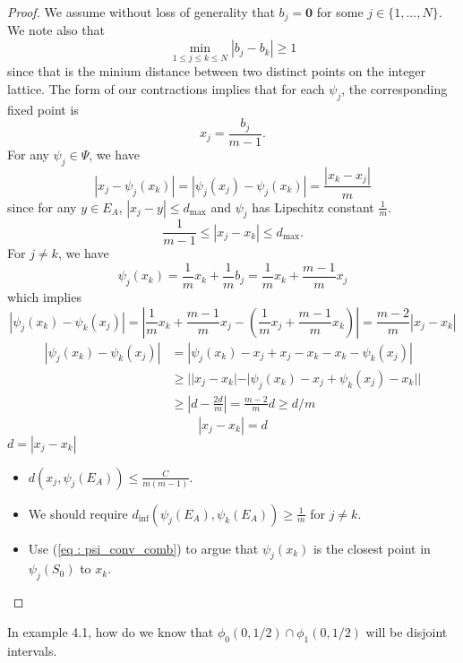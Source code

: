 \documentclass [52pt] {article}
\begin{document}
\begin{proof}
We assume without loss of generality that $b_j = \mathbf{0}$ for some $j\in\{1,...,N\}$.  We note also that 
\[\min_{1\le j\le k\le N}|b_j - b_k| \ge 1\]
since that is the minium distance between two distinct points on the integer lattice.  The form of our contractions implies that for each $\psi_j$, the corresponding fixed point is 
\[x_j = \frac{b_j}{m-1}.\]
For any $\psi_j\in\Psi$, we have
\[|x_j-\psi_j(x_k)|= |\psi_j(x_j) - \psi_j(x_k)| = \frac{|x_k-x_j|}{m}\]
since for any $y\in E_A$, $|x_j-y|\le d_{\max}$ and $\psi_j$ has Lipschitz constant $\frac{1}{m}$.
\[\frac{1}{m-1}\le |x_j-x_k|\le d_{\max}.\]
For $j\not=k$, we have
\begin{equation}\label{eq : psi_conv_comb}
\psi_j(x_k) = \frac{1}{m}x_k+\frac{1}{m}b_j = \frac{1}{m}x_k+\frac{m-1}{m}x_j
\end{equation}
which implies
\[|\psi_j(x_k)-\psi_k(x_j)| = \left|\frac{1}{m}x_k+\frac{m-1}{m}x_j-\left(\frac{1}{m}x_j+\frac{m-1}{m}x_k\right)\right|=\frac{m-2}{m}|x_j-x_k|\]
\[\begin{split}
|\psi_j(x_k) -\psi_k(x_j)|&= |\psi_j(x_k)-x_j+x_j-x_k-x_k-\psi_k(x_j)|\\
&\ge ||x_j-x_k|-|\psi_j(x_k)-x_j +\psi_k(x_j)-x_k||\\
& \ge |d-\frac{2d}{m}| = \frac{m-2}{m}d\ge d/m
\end{split}\]
\[|x_j-x_k|=d\]
$d = |x_j-x_k|$

\begin{itemize}
\item $d(x_j,\psi_j(E_A))\le \frac{C}{m(m-1)}.$
\item We should require $d_{\inf}(\psi_j(E_A),\psi_k(E_A))\ge \frac{1}{m}$ for $j\not= k$.
\item Use (\ref{eq : psi_conv_comb}) to argue that $\psi_j(x_k)$ is the closest point in $\psi_j(S_0)$ to $x_k$.
\end{itemize}

\end{proof}
In example 4.1, how do we know that $\phi_0(0,1/2)\cap\phi_1(0,1/2)$ will be disjoint intervals.
\\\\
\end{document}

